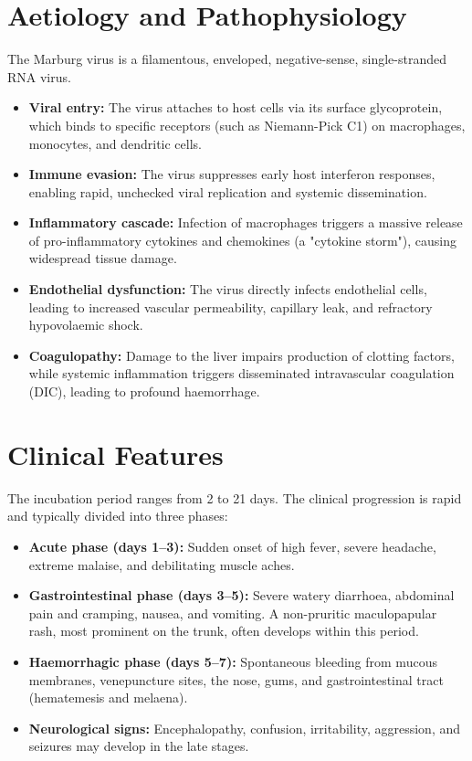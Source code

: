 \section*{Aetiology and Pathophysiology}
The Marburg virus is a filamentous, enveloped, negative-sense, single-stranded RNA virus.
\begin{itemize}
    \item \textbf{Viral entry:} The virus attaches to host cells via its surface glycoprotein, which binds to specific receptors (such as Niemann-Pick C1) on macrophages, monocytes, and dendritic cells.
    \item \textbf{Immune evasion:} The virus suppresses early host interferon responses, enabling rapid, unchecked viral replication and systemic dissemination.
    \item \textbf{Inflammatory cascade:} Infection of macrophages triggers a massive release of pro-inflammatory cytokines and chemokines (a "cytokine storm"), causing widespread tissue damage.
    \item \textbf{Endothelial dysfunction:} The virus directly infects endothelial cells, leading to increased vascular permeability, capillary leak, and refractory hypovolaemic shock.
    \item \textbf{Coagulopathy:} Damage to the liver impairs production of clotting factors, while systemic inflammation triggers disseminated intravascular coagulation (DIC), leading to profound haemorrhage.
\end{itemize}

\section*{Clinical Features}
The incubation period ranges from 2 to 21 days. The clinical progression is rapid and typically divided into three phases:
\begin{itemize}
    \item \textbf{Acute phase (days 1--3):} Sudden onset of high fever, severe headache, extreme malaise, and debilitating muscle aches.
    \item \textbf{Gastrointestinal phase (days 3--5):} Severe watery diarrhoea, abdominal pain and cramping, nausea, and vomiting. A non-pruritic maculopapular rash, most prominent on the trunk, often develops within this period.
    \item \textbf{Haemorrhagic phase (days 5--7):} Spontaneous bleeding from mucous membranes, venepuncture sites, the nose, gums, and gastrointestinal tract (hematemesis and melaena).
    \item \textbf{Neurological signs:} Encephalopathy, confusion, irritability, aggression, and seizures may develop in the late stages.
\end{itemize}

